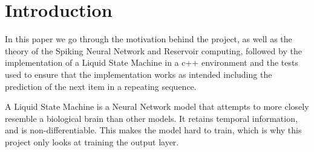 \chapter{Introduction}

In this paper we go through the motivation behind the project, as well as the theory of the Spiking Neural Network and Reservoir computing, followed by the implementation of a Liquid State Machine in a c++ environment and the tests used to ensure that the implementation works as intended including the prediction of the next item in a repeating sequence.

A Liquid State Machine is a Neural Network model that attempts to more closely resemble a biological brain than other models. It retains temporal information, and is non-differentiable. This makes the model hard to train, which is why this project only looks at training the output layer.

